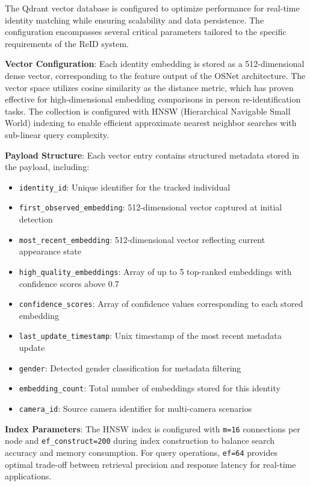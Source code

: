 The Qdrant vector database is configured to optimize performance for real-time identity matching while ensuring scalability and data persistence. The configuration encompasses several critical parameters tailored to the specific requirements of the ReID system.

\textbf{Vector Configuration}: Each identity embedding is stored as a 512-dimensional dense vector, corresponding to the feature output of the OSNet architecture. The vector space utilizes cosine similarity as the distance metric, which has proven effective for high-dimensional embedding comparisons in person re-identification tasks. The collection is configured with HNSW (Hierarchical Navigable Small World) indexing to enable efficient approximate nearest neighbor searches with sub-linear query complexity.

\textbf{Payload Structure}: Each vector entry contains structured metadata stored in the payload, including:
\begin{itemize}
    \item \texttt{identity\_id}: Unique identifier for the tracked individual
    \item \texttt{first\_observed\_embedding}: 512-dimensional vector captured at initial detection
    \item \texttt{most\_recent\_embedding}: 512-dimensional vector reflecting current appearance state
    \item \texttt{high\_quality\_embeddings}: Array of up to 5 top-ranked embeddings with confidence scores above 0.7
    \item \texttt{confidence\_scores}: Array of confidence values corresponding to each stored embedding
    \item \texttt{last\_update\_timestamp}: Unix timestamp of the most recent metadata update
    \item \texttt{gender}: Detected gender classification for metadata filtering
    \item \texttt{embedding\_count}: Total number of embeddings stored for this identity
    \item \texttt{camera\_id}: Source camera identifier for multi-camera scenarios
\end{itemize}

\textbf{Index Parameters}: The HNSW index is configured with \texttt{m=16} connections per node and \texttt{ef\_construct=200} during index construction to balance search accuracy and memory consumption. For query operations, \texttt{ef=64} provides optimal trade-off between retrieval precision and response latency for real-time applications.

